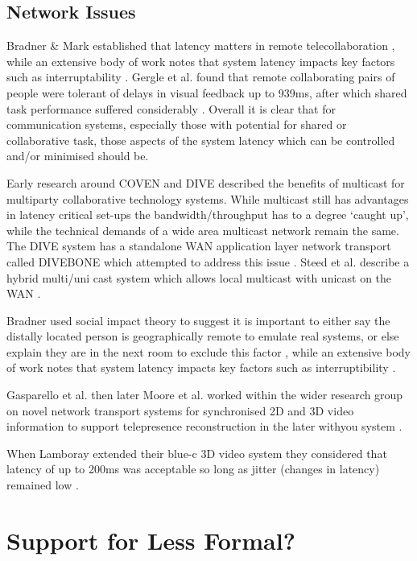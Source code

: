               \subsection{Network Issues}
            Bradner \& Mark established that latency matters in remote telecollaboration \cite{Bradner:2002:WDM:587078.587110}, while an extensive body of work notes that system latency impacts key factors such as interruptability \cite{Avrahami2007}. Gergle et al. found that remote collaborating pairs of people were tolerant of delays in visual feedback up to 939ms, after which shared task performance suffered considerably \cite{Gergle2006}. Overall it is clear that for communication systems, especially those with potential for shared or collaborative task, those aspects of the system latency which can be controlled and/or minimised should be.\par
             Early research around COVEN and DIVE described the benefits of multicast for multiparty collaborative technology systems. While multicast still has advantages in latency critical set-ups the bandwidth/throughput has to a degree `caught up', while the technical demands of a wide area multicast network remain the same. The DIVE system has a standalone WAN application layer network transport called DIVEBONE which attempted to address this issue \cite{Greenhalgh2001a}. Steed et al. describe a hybrid multi/uni cast system which allows local multicast with unicast on the WAN \cite{Greenhalgh2001}.\par
              Bradner used social impact theory to suggest  it is important to either say the distally located person is geographically remote to emulate real systems, or else explain they are in the next room to exclude this factor \cite{Bradner:2002:WDM:587078.587110}, while an extensive body of work notes that system latency impacts key factors such as interruptibility \cite{Avrahami2007}.\par
         Gasparello et al. \cite{Gasparello:2011in} then later Moore et al. \cite{Moore:2010jt} worked within the wider research group on novel network transport systems for synchronised 2D and 3D video information to support telepresence reconstruction in the later withyou system \cite{Roberts2015}. \par
       When Lamboray extended their blue-c 3D video system they considered that latency of up to 200ms was acceptable so long as jitter (changes in latency) remained low \cite{Park1999, lamboray2005data}.

        \section{Support for Less Formal?}
        
